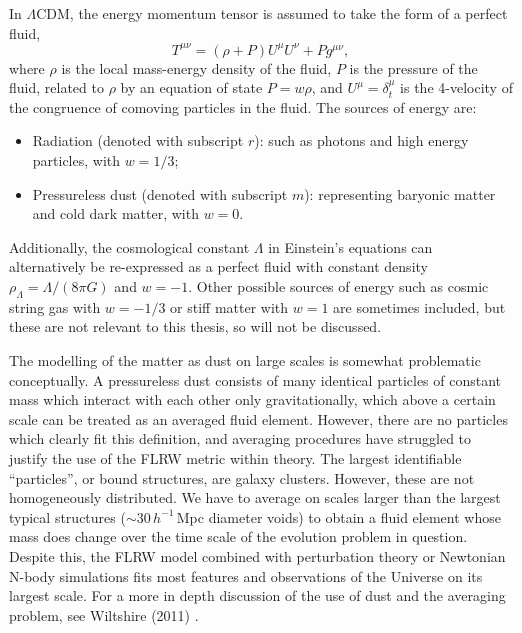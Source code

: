 \documentclass[a4paper,12pt]{report}
\begin{document}
In $\Lambda$CDM, the energy momentum tensor is assumed to take the form of a perfect fluid,
\begin{equation}\label{eqn: FLRW energy momentum tensor}
  T^{\mu \nu} = (\rho + P)U^{\mu}U^{\nu}+Pg^{\mu \nu},
\end{equation}
where $\rho$ is the local mass-energy density of the fluid, $P$ is the pressure of the fluid, related to $\rho$ by an equation of state $P=w\rho$, and $U^\mu = \delta^\mu_t$ is the 4-velocity of the congruence of comoving particles in the fluid. The sources of energy are:
\begin{itemize}
  \item Radiation (denoted with subscript $r$): such as photons and high energy particles, with $w=1/3$;
  \item Pressureless dust (denoted with subscript $m$): representing baryonic matter and cold dark matter, with $w=0$.
\end{itemize}
Additionally, the cosmological constant $\Lambda$ in Einstein's equations can alternatively be re-expressed as a perfect fluid with constant density $\rho_\Lambda = \Lambda/(8\pi G)$ and $w=-1$. Other possible sources of energy such as cosmic string gas with $w=-1/3$ or stiff matter with $w=1$ are sometimes included, but these are not relevant to this thesis, so will not be discussed.

The modelling of the matter as dust on large scales is somewhat problematic conceptually. A pressureless dust consists of many identical particles of constant mass which interact with each other only gravitationally, which above a certain scale can be treated as an averaged fluid element. However, there are no particles which clearly fit this definition, and averaging procedures have struggled to justify the use of the FLRW metric within theory. The largest identifiable ``particles'', or bound structures, are galaxy clusters. However, these are not homogeneously distributed. We have to average on scales larger than the largest typical structures ($\sim30\,h^{-1}\,$Mpc diameter voids) to obtain a fluid element whose mass does change over the time scale of the evolution problem in question. Despite this, the FLRW model combined with perturbation theory or Newtonian N-body simulations fits most features and observations of the Universe on its largest scale. For a more in depth discussion of the use of dust and the averaging problem, see Wiltshire (2011) \cite{RN179}.
\end{document}
